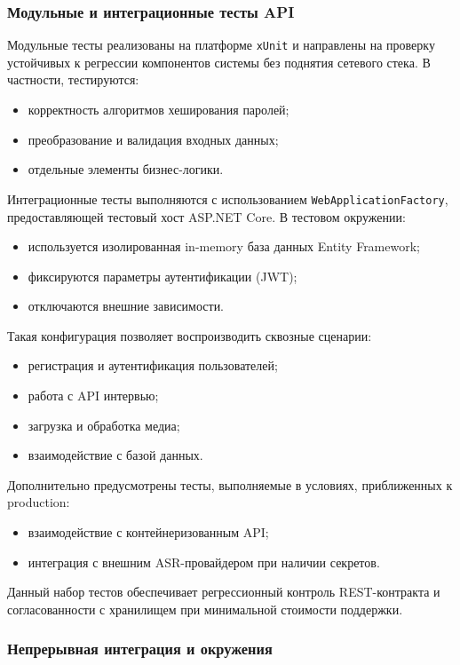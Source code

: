 \documentclass{article}
\begin{document}
\subsubsection{Модульные и интеграционные тесты API}

Модульные тесты реализованы на платформе \texttt{xUnit} и направлены на проверку устойчивых к регрессии компонентов системы без поднятия сетевого стека. В частности, тестируются:
\begin{itemize}
\item корректность алгоритмов хеширования паролей;
\item преобразование и валидация входных данных;
\item отдельные элементы бизнес-логики.
\end{itemize}

Интеграционные тесты выполняются с использованием \texttt{WebApplicationFactory}, предоставляющей тестовый хост ASP.NET Core. В тестовом окружении:
\begin{itemize}
\item используется изолированная in-memory база данных Entity Framework;
\item фиксируются параметры аутентификации (JWT);
\item отключаются внешние зависимости.
\end{itemize}

Такая конфигурация позволяет воспроизводить сквозные сценарии:
\begin{itemize}
\item регистрация и аутентификация пользователей;
\item работа с API интервью;
\item загрузка и обработка медиа;
\item взаимодействие с базой данных.
\end{itemize}

Дополнительно предусмотрены тесты, выполняемые в условиях, приближенных к production:
\begin{itemize}
\item взаимодействие с контейнеризованным API;
\item интеграция с внешним ASR-провайдером при наличии секретов.
\end{itemize}

Данный набор тестов обеспечивает регрессионный контроль REST-контракта и согласованности с хранилищем при минимальной стоимости поддержки.

\subsubsection{Непрерывная интеграция и окружения}
\end{document}
